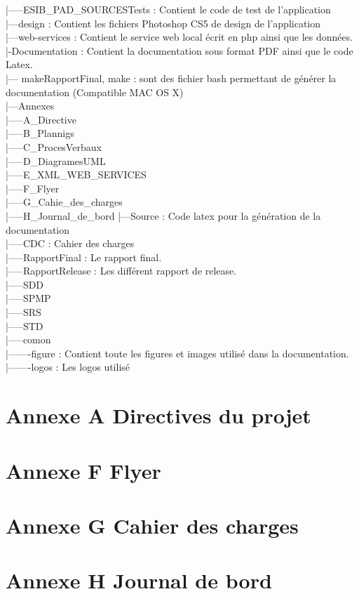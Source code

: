 \documentclass[12pt,a4paper,twoside]{report}
\begin{document}
 |-----ESIB\_PAD\_SOURCESTests : Contient le code de test de l'application\\
 |---design : Contient les fichiers Photoshop CS5 de design de l'application\\
 |---web-services : Contient le service web local écrit en php ainsi que les données.\\
 |-Documentation : Contient la documentation sous format PDF ainsi que le code Latex. \\
 |--- makeRapportFinal, make : sont des fichier bash permettant de générer la documentation (Compatible MAC OS X)\\
 |---Annexes\\
 |-----A\_Directive\\
 |-----B\_Plannigs\\
 |-----C\_ProcesVerbaux\\
 |-----D\_DiagramesUML\\
 |-----E\_XML\_WEB\_SERVICES\\
 |-----F\_Flyer\\
 |-----G\_Cahie\_des\_charges\\
 |-----H\_Journal\_de\_bord
 |---Source : Code latex pour la génération de la documentation\\
 |-----CDC : Cahier des charges\\
 |-----RapportFinal : Le rapport final.\\
 |-----RapportRelease : Les différent rapport de release.\\
 |-----SDD \\
 |-----SPMP\\
 |-----SRS\\
 |-----STD\\
 |-----comon\\
 |-------figure : Contient toute les figures et images utilisé dans la documentation.\\
 |-------logos : Les logos utilisé\\



\cleardoublepage
\chapter*{Annexe A \- Directives du projet}
\cleardoublepage
\chapter*{Annexe F \- Flyer}
\cleardoublepage
\chapter*{Annexe G \- Cahier des charges}

\cleardoublepage
\chapter*{Annexe H \- Journal de bord}


%

%
\end{document}
